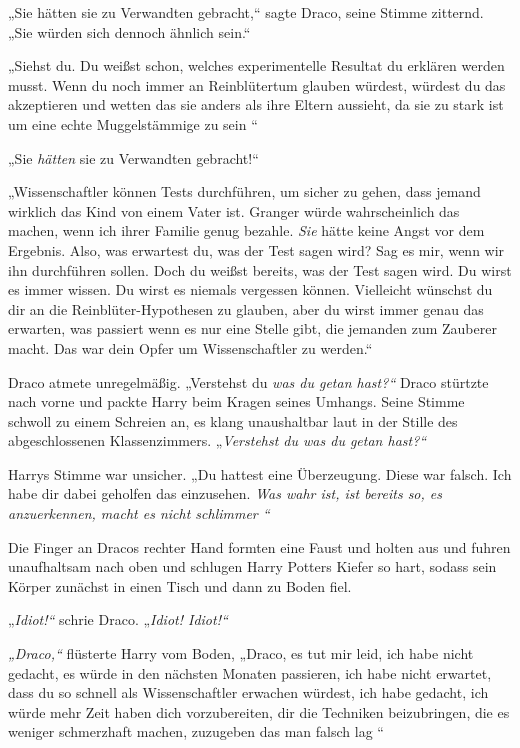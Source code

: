 {„Sie hätten sie zu Verwandten gebracht,“ sagte Draco, seine Stimme zitternd. „Sie würden sich dennoch ähnlich sein.“

„Siehst du. Du weißst schon, welches experimentelle Resultat du erklären werden musst. Wenn du noch immer an Reinblütertum glauben würdest, würdest du das akzeptieren und wetten das sie anders als ihre Eltern aussieht, da sie zu stark ist um eine echte Muggelstämmige zu sein \later“

„Sie \emph{hätten} sie zu Verwandten gebracht!“

„Wissenschaftler können Tests durchführen, um sicher zu gehen, dass jemand wirklich das Kind von einem Vater ist. Granger würde wahrscheinlich das machen, wenn ich ihrer Familie genug bezahle. \emph{Sie} hätte keine Angst vor dem Ergebnis. Also, was erwartest du, was der Test sagen wird? Sag es mir, wenn wir ihn durchführen sollen. Doch du weißst bereits, was der Test sagen wird. Du wirst es immer wissen. Du wirst es niemals vergessen können. Vielleicht wünschst du dir an die Reinblüter-Hypothesen zu glauben, aber du wirst immer genau das erwarten, was passiert wenn es nur eine Stelle gibt, die jemanden zum Zauberer macht. Das war dein Opfer um Wissenschaftler zu werden.“

Draco atmete unregelmäßig. „Verstehst du \emph{was du getan hast?“} Draco stürtzte nach vorne und packte Harry beim Kragen seines Umhangs. Seine Stimme schwoll zu einem Schreien an, es klang unaushaltbar laut in der Stille des abgeschlossenen Klassenzimmers. „\emph{Verstehst du was du getan hast?“}

Harrys Stimme war unsicher. „Du hattest eine Überzeugung. Diese war falsch. Ich habe dir dabei geholfen das einzusehen. \emph{Was wahr ist, ist bereits so, es anzuerkennen, macht es nicht schlimmer \later“}

Die Finger an Dracos rechter Hand formten eine Faust und holten aus und fuhren unaufhaltsam nach oben und schlugen Harry Potters Kiefer so hart, sodass sein Körper zunächst in einen Tisch und dann zu Boden fiel.

„\emph{Idiot!“} schrie Draco. „\emph{Idiot! Idiot!“}

\emph{„Draco,“} flüsterte Harry vom Boden, „Draco, es tut mir leid, ich habe nicht gedacht, es würde in den nächsten Monaten passieren, ich habe nicht erwartet, dass du so schnell als Wissenschaftler erwachen würdest, ich habe gedacht, ich würde mehr Zeit haben dich vorzubereiten, dir die Techniken beizubringen, die es weniger schmerzhaft machen, zuzugeben das man falsch lag \later“

}
